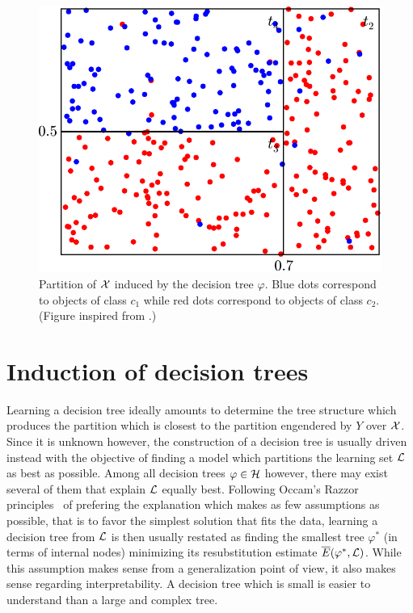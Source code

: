 \begin{figure}
    \centering
    \includegraphics[scale=0.5]{figures/ch3_partition.pdf}
    \caption{Partition of ${\cal X}$ induced by the decision tree $\varphi$.
             Blue dots correspond to objects of class $c_1$ while red dots correspond
             to objects of class $c_2$. (Figure inspired from \citet{breiman:1984}.)}
    \label{fig:3:partition}
\end{figure}


\section{Induction of decision trees}
\label{sec:3:induction}

Learning a decision tree ideally amounts to determine the tree structure which
produces the partition which is closest to the partition engendered by $Y$ over
${\cal X}$. Since it is unknown however, the construction of a decision tree is usually
driven instead with the objective of finding a model which partitions the
learning set ${\cal L}$ as best as possible. Among all decision trees $\varphi
\in {\cal H}$ however, there may exist several of them that explain ${\cal L}$
equally best. Following Occam's Razzor principles~\citep{blumer:1987} of prefering the explanation
which makes as few assumptions as possible, that is to favor the simplest
solution that fits the data, learning a decision tree from ${\cal L}$ is then
usually restated as finding the smallest tree $\varphi^*$ (in terms of internal nodes) minimizing its
resubstitution estimate $\overline{E}(\varphi^*, {\cal L})$. While this
assumption makes sense from a generalization point of view, it also makes
sense regarding interpretability. A decision tree which is small is easier
to understand than a large and complex tree.

